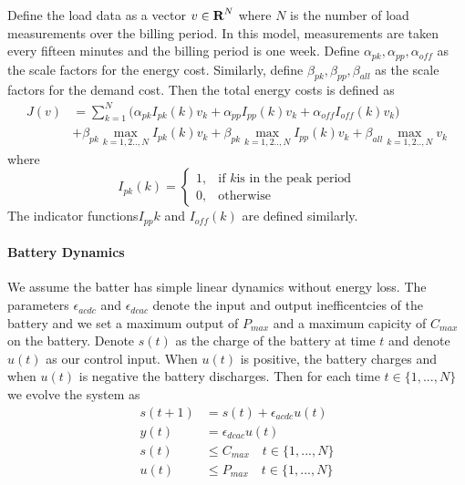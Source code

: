 \documentclass[12pt]{article}
\begin{document}
Define the load data as a vector $v \in {\mbox{\bf R}}^N$ where $N$ is the number of load measurements over the billing period. In this model, measurements are taken every fifteen minutes and the billing period is one week. Define $\alpha_{pk}, \alpha_{pp}, \alpha_{off}$ as the scale factors for the energy cost. Similarly, define $\beta_{pk}, \beta_{pp}, \beta_{all}$ as the scale factors for the demand cost. Then the total energy costs is defined as
\begin{equation}
\begin{split}
J(v) &= \sum_{k=1}^N \big( \alpha_{pk} I_{pk}(k)v_k + \alpha_{pp} I_{pp}(k)v_k+ \alpha_{off} I_{off}(k)v_k \big)  \\
&+ \beta_{pk} \max_{k=1,2..,N} I_{pk}(k)v_k +\beta_{pk} \max_{k=1,2..,N} I_{pp}(k)v_k +\beta_{all} \max_{k=1,2..,N} v_k
\end{split}
\end{equation}
where 
\begin{equation}\label{costfun}
I_{pk}(k)= 
\begin{cases}
    1,& \text{if } k \text{is in the peak period}\\
    0,              & \text{otherwise}
\end{cases}
\end{equation}
The indicator functions$ I_{pp}{k}$ and $I_{off}(k)$ are defined similarly.



\paragraph{Battery Dynamics}
We assume the batter has simple linear dynamics without energy loss. The parameters $\epsilon_{acdc}$ and $\epsilon_{dcac}$ denote the input and output inefficentcies of the battery and we set a maximum output of $P_{max}$ and a maximum capicity of $C_{max}$ on the battery. Denote $s(t)$ as the charge of the battery at time $t$ and denote $u(t)$ as our control input. When $u(t)$ is positive, the battery charges and when $u(t)$ is negative the battery discharges. Then for each time $t \in \{1,...,N\}$ we evolve the system as 
\begin{equation}
\begin{split}
s(t+1) &= s(t) + \epsilon_{acdc} u(t) \\ 
y(t) &=   \epsilon_{dcac} u(t) \\
s(t) & \leq C_{max} \quad t \in \{1,...,N\} \\
u(t) & \leq P_{max} \quad t \in \{1,...,N\}
\end{split}
\end{equation}
\end{document}
